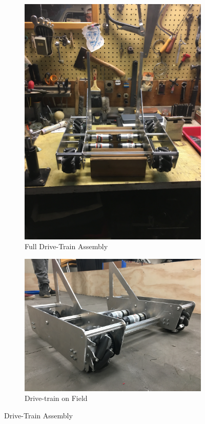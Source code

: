 \documentclass{article}
\begin{document}
\begin{figure}[h!]
\begin{subfigure}{.45\textwidth}
  \includegraphics[width=\textwidth,angle=-90]{10_11-05/images/FullDrive.JPG}
  \caption{Full Drive-Train Assembly}
  \label{fig:Drivetrain}
  \end{subfigure}
  \begin{subfigure}{.45\textwidth}
    \Centering
    \includegraphics[width=\textwidth]{10_11-05/images/drivetrain.JPG}
    \caption{Drive-train on Field}
    \label{Drive}
  \end{subfigure}
  \caption{Drive-Train Assembly}
  \end{figure}
  
\end{document}
